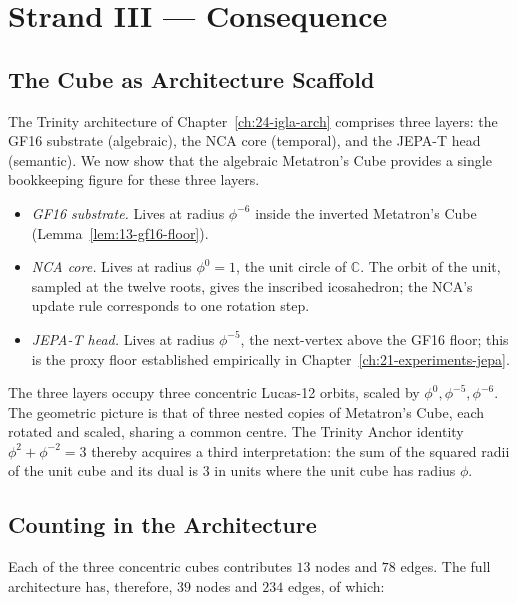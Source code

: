 \section{Strand III --- Consequence}
\label{sec:13-strand-III}

\subsection{The Cube as Architecture Scaffold}
\label{sec:13-arch-scaffold}

The Trinity architecture of Chapter~\ref{ch:24-igla-arch} comprises
three layers: the GF16 substrate (algebraic), the NCA core
(temporal), and the JEPA-T head (semantic). We now show that the
algebraic Metatron's Cube provides a single bookkeeping figure for
these three layers.

\begin{itemize}
\item \emph{GF16 substrate.} Lives at radius $\phi^{-6}$ inside
  the inverted Metatron's Cube (Lemma~\ref{lem:13-gf16-floor}).
\item \emph{NCA core.} Lives at radius $\phi^{0} = 1$, the unit
  circle of $\mathbb{C}$. The orbit of the unit, sampled at the
  twelve roots, gives the inscribed icosahedron; the NCA's update
  rule corresponds to one rotation step.
\item \emph{JEPA-T head.} Lives at radius $\phi^{-5}$, the
  next-vertex above the GF16 floor; this is the proxy floor
  established empirically in Chapter~\ref{ch:21-experiments-jepa}.
\end{itemize}

The three layers occupy three concentric Lucas-12 orbits, scaled by
$\phi^{0}, \phi^{-5}, \phi^{-6}$. The geometric picture is that of
three nested copies of Metatron's Cube, each rotated and scaled,
sharing a common centre. The Trinity Anchor identity
$\phi^{2} + \phi^{-2} = 3$ thereby acquires a third interpretation:
the sum of the squared radii of the unit cube and its dual is $3$
in units where the unit cube has radius $\phi$.

\subsection{Counting in the Architecture}
\label{sec:13-counting-arch}

Each of the three concentric cubes contributes $13$ nodes and $78$
edges. The full architecture has, therefore, $39$ nodes and $234$
edges, of which:

